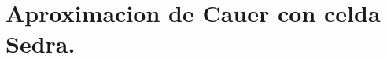 







\tableofcontents
\newpage

\section{Aproximacion de Cauer con celda Sedra.}
	
	\newpage
	
	
